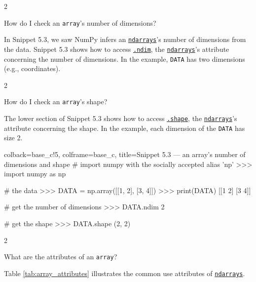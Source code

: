 \documentclass[a4paper,11pt]{book}
\newcommand{\question}[1]{%
    \begin{tcolorbox}[colback=comp_c!10,colframe=comp_c,sidebyside align=top,width=\linewidth,before skip=1ex]
        #1
    \end{tcolorbox}
    \switchcolumn%
}
\newcommand{\note}[1]{%
    \begin{tcolorbox}[colback=white!0,colframe=white!10,width=\linewidth,before skip=1ex]
        #1
    \end{tcolorbox}
}
\begin{document}
\begin{paracol}{2}
	\question{\raggedright How do I check an \texttt{array}'s number of dimensions?}
	\note{In Snippet 5.3, we saw NumPy infers an \href{https://numpy.org/doc/stable/reference/arrays.ndarray.html}{\texttt{ndarrays}}'s number of dimensions from the data. Snippet 5.3 shows how to access \href{https://numpy.org/doc/stable/reference/generated/numpy.ndarray.ndim.html\#numpy.ndarray.ndim}{\texttt{.ndim}}, the \href{https://numpy.org/doc/stable/reference/arrays.ndarray.html}{\texttt{ndarrays}}'s attribute concerning the number of dimensions. In the example, \texttt{DATA} has two dimensions (e.g., coordinates).}
\end{paracol}

\begin{paracol}{2}
	\question{\raggedright How do I check an \texttt{array}'s shape?}
	\note{The lower section of Snippet 5.3 shows how to access \href{https://numpy.org/doc/stable/reference/generated/numpy.ndarray.shape.html\#numpy.ndarray.shape}{\texttt{.shape}}, the \href{https://numpy.org/doc/stable/reference/arrays.ndarray.html}{\texttt{ndarrays}}'s attribute concerning the shape. In the example, each dimension of the \texttt{DATA} has size 2.}
\end{paracol}

\begin{pythoncode}[linenos=true,]{colback=base_c!5, colframe=base_c, title=\sffamily Snippet 5.3 --- an array's number of dimensions and shape}
# import numpy with the socially accepted alias 'np'
>>> import numpy as np

# the data
>>> DATA = np.array([[1, 2], [3, 4]])
>>> print(DATA)
[[1 2]
 [3 4]]

# get the number of dimensions
>>> DATA.ndim 
2

# get the shape
>>> DATA.shape
(2, 2)
\end{pythoncode}

\begin{paracol}{2}
	\question{\raggedright What are the attributes of an \texttt{array}?}
	\note{Table \ref{tab:array_attributes} illustrates the common use attributes of \href{https://numpy.org/doc/stable/reference/arrays.ndarray.html}{\texttt{ndarrays}}.}
\end{paracol}
\end{document}
